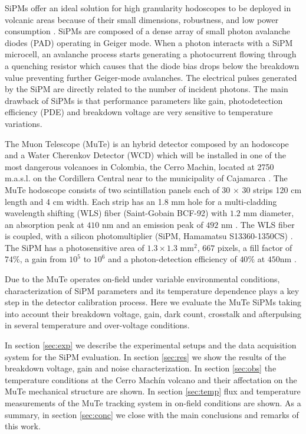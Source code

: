 \documentclass[a4paper,11pt]{article}
\begin{document}
SiPMs offer an ideal solution for high granularity hodoscopes to be deployed in volcanic areas because of their small dimensions, robustness, and low power consumption \cite{Ambrosino2014}. SiPMs are composed of a dense array of small photon avalanche diodes (PAD) operating in Geiger mode. When a photon interacts with a SiPM microcell, an avalanche process starts generating a photocurrent flowing through a quenching resistor which causes that the diode bias drops below the breakdown value preventing further Geiger-mode avalanches. The electrical pulses generated by the SiPM are directly related to the number of incident photons. The main drawback of SiPMs is that performance parameters like gain, photodetection efficiency (PDE) and breakdown voltage are very sensitive to temperature variations.

The Muon Telescope (MuTe) is an hybrid detector composed by an hodoscope and a Water Cherenkov Detector (WCD) which will be installed in one of the most dangerous volcanoes in Colombia, the Cerro Machin, located at 2750 m.a.s.l. on the Cordillera Central near to the municipality of Cajamarca \cite{AsoreyEtal2017B}. The MuTe hodoscope consists of two scintillation panels each of 30 $\times$ 30 strips 120 cm length and 4 cm width. Each strip has an 1.8 mm hole for a multi-cladding wavelength shifting (WLS) fiber (Saint-Gobain BCF-92)  with $1.2$ mm diameter, an absorption peak at $410$ nm and an emission peak of $492$ nm \cite{SaintGobain2018}. The WLS fiber is coupled, with a silicon photomultiplier (SiPM, Hamamatsu S13360-1350CS) \cite{Hamamatsu2018}. The SiPM has a photosensitive area of $1.3 \times 1.3 \textrm{ mm}^2$, $667$ pixels, a fill factor of $74\%$, a gain from $10^5$ to $10^6$ and a photon-detection efficiency of $40 \%$ at $450 \textrm{nm}$ \cite{pena2019calibration, PenaRodriguezEtal2018}.

Due to the MuTe operates on-field under variable environmental conditions, characterization of SiPM parameters and its temperature dependence plays a key step in the detector calibration process. Here we evaluate the MuTe SiPMs taking into account their breakdown voltage, gain, dark count, crosstalk and afterpulsing in several temperature and over-voltage conditions. 

In section \ref{sec:exp} we describe the experimental setups and the data acquisition system for the SiPM evaluation. In section \ref{sec:res} we show the results of the breakdown voltage, gain and noise characterization. In section \ref{sec:obs} the temperature conditions at the Cerro Mach\'in volcano and their affectation on the MuTe mechanical structure are shown. In section \ref{sec:temp} flux and temperature measurements of the MuTe tracking system in on-field conditions are shown. As a summary, in section \ref{sec:conc} we close with the main conclusions and remarks of this work.
\end{document}
